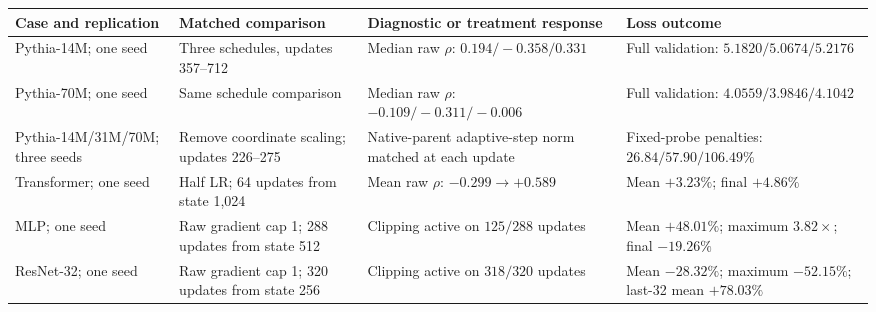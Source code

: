 \begin{tabular}{>{\raggedright\arraybackslash}p{}>{\raggedright\arraybackslash}p{}>{\raggedright\arraybackslash}p{}>{\raggedright\arraybackslash}p{}}
\toprule
Case and replication & Matched comparison & Diagnostic or treatment response & Loss outcome \\
\midrule
Pythia-14M; one seed & Three schedules, updates 357--712
 & Median raw $\rho$: $0.194/-0.358/0.331$
 & Full validation: $5.1820/5.0674/5.2176$ \\
Pythia-70M; one seed & Same schedule comparison
 & Median raw $\rho$: $-0.109/-0.311/-0.006$
 & Full validation: $4.0559/3.9846/4.1042$ \\
Pythia-14M/31M/70M; three seeds
 & Remove coordinate scaling; updates 226--275
 & Native-parent adaptive-step norm matched at each update
 & Fixed-probe penalties: $26.84/57.90/106.49\%$ \\
\midrule
Transformer; one seed & Half LR; 64 updates from state 1,024
 & Mean raw $\rho$: $-0.299\to+0.589$
 & Mean $+3.23\%$; final $+4.86\%$ \\
MLP; one seed & Raw gradient cap 1; 288 updates from state 512
 & Clipping active on $125/288$ updates
 & Mean $+48.01\%$; maximum $3.82\times$; final $-19.26\%$ \\
ResNet-32; one seed & Raw gradient cap 1; 320 updates from state 256
 & Clipping active on $318/320$ updates
 & Mean $-28.32\%$; maximum $-52.15\%$; last-32 mean $+78.03\%$ \\
\bottomrule
\end{tabular}
